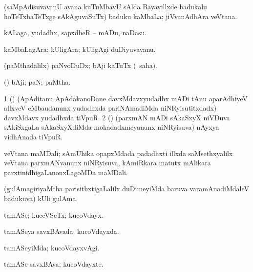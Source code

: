 \noindent 
\gl{\pagu}
\expl{}
\bmng
{} (saMpAdisuvavanU avana kuTuMbavU sAlda Bayavillxde badukalu hoTeTxbaTeTxge sAkAguvaSuTx) baduku kaMbaLa; jiVvanAdhAra veVtana. 
\emng
\eentry

\bentry
{} 
\gl{\sakirx}
\expl{}
\bmng
kALaga, yudadhx, sapxdheR -- mADu, naDasu. 
\emng
\eentry

\bentry
{} 
\gl{\nA}
\expl{}
\bmng
{} 
\emng
\eentry

\bentry
{} 
\gl{\nA}
\expl{}
\bmng
kaMbaLagAra; kUligAra; kUligAgi duDiyuvavanu. 
\emng
\eentry

\bentry
{} 
\gl{\sakirx}
\expl{}
\bmng
(paMthadalilx) paNvoDuDx; bAji kaTuTx (\akirx\ saha). 
\emng
\eentry

\bentry
{} 
\gl{\nA}
\expl{}
\bmng
(\ca) bAji; paN; paMtha. 
\emng

\noindent 
\gl{\pagu }
\bmng
\bnum
\num{1}  (\ca) (ApAditanu ApAdakanoDane davxMdavxyudadhx mADi tAnu aparAdhiyeV allxveV eMbaudanunx yudadhxda pariNAmadiMda niNRyisutitxdadx) davxMdavx yudadhxda tiVpuR. 
\num{2}  (\ca) (parxmAN mADi sAkaSxyX niVDuva sAkiSxgaLa sAkaSxyXdiMda mokadadxmeyanunx niNRyisuva) nAyxya vidhAnada tiVpuR. 
\enum
\emng
\eentry

\bentry
{}
\gl{\nA}
\expl{}
\bmng
veVtana maMDali; sAmUhika opapxMdada padadhxti illxda saMsethxyalilx veVtana parxmANvanunx niNRyisuva, kAmiRkara matutx mAlikara parxtinidhigaLanonxLagoMDa maMDali. 
\emng
\eentry

\bentry
{}
\gl{\nA}
\expl{}
\bmng
(gulAmagiriyaMtha parisithxtigaLalilx duDimeyiMda baruva varamAnadiMdaleV badukuva) kUli gulAma. 
\emng
\eentry

\bentry
{} 
\gl{\nA}
\bmng
 tamASe; kuceVSeTx; kucoVdayx. 
\emng
\eentry

\bentry
{} 
\gl{\gu}
\expl{}
\bmng
tamASeya savxBAvada; kucoVdayxda. 
\emng
\eentry

\bentry
{} 
\gl{\kirxvi}
\expl{}
\bmng
tamASeyiMda; kucoVdayxvAgi. 
\emng
\eentry

\bentry
{} 
\gl{\nA}
\expl{}
\bmng
tamASe savxBAva; kucoVdayxte. 
\emng
\eentry

